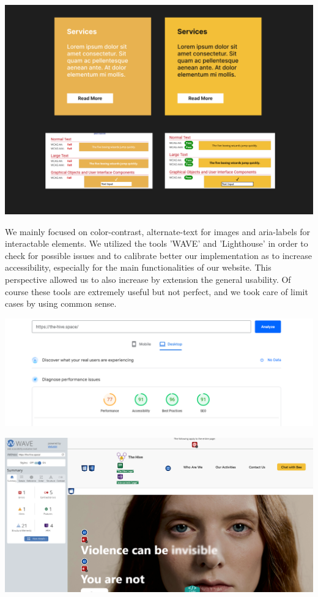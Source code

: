 \begin{center}
    \includegraphics[width=0.75\linewidth]{img/color-contrast-check.png}
\end{center}

\vspace{1em}
We mainly focused on color-contrast, alternate-text for images and aria-labels for interactable elements.
We utilized the tools 'WAVE' and 'Lighthouse' in order to check for possible issues and to calibrate better our
implementation as to increase accessibility, especially for the main functionalities of our website.
This perspective allowed us to also increase by extension the general usability.
Of course these tools are extremely useful but not perfect, and we took care of limit cases by using common sense.
\vspace{1em}

\begin{center}
    \includegraphics[width=0.75\linewidth]{img/lighthouse-result.png}
\end{center}

\vspace{1em}

\begin{center}
    \includegraphics[width=0.75\linewidth]{img/wave-result.png}
\end{center}
